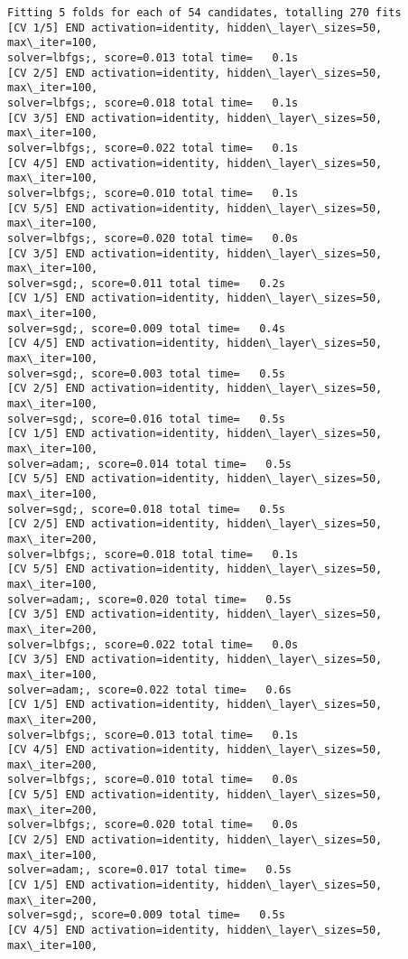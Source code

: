 \documentclass[11pt]{article}
\begin{document}
    \begin{Verbatim}[commandchars=\\\{\}]
Fitting 5 folds for each of 54 candidates, totalling 270 fits
[CV 1/5] END activation=identity, hidden\_layer\_sizes=50, max\_iter=100,
solver=lbfgs;, score=0.013 total time=   0.1s
[CV 2/5] END activation=identity, hidden\_layer\_sizes=50, max\_iter=100,
solver=lbfgs;, score=0.018 total time=   0.1s
[CV 3/5] END activation=identity, hidden\_layer\_sizes=50, max\_iter=100,
solver=lbfgs;, score=0.022 total time=   0.1s
[CV 4/5] END activation=identity, hidden\_layer\_sizes=50, max\_iter=100,
solver=lbfgs;, score=0.010 total time=   0.1s
[CV 5/5] END activation=identity, hidden\_layer\_sizes=50, max\_iter=100,
solver=lbfgs;, score=0.020 total time=   0.0s
[CV 3/5] END activation=identity, hidden\_layer\_sizes=50, max\_iter=100,
solver=sgd;, score=0.011 total time=   0.2s
[CV 1/5] END activation=identity, hidden\_layer\_sizes=50, max\_iter=100,
solver=sgd;, score=0.009 total time=   0.4s
[CV 4/5] END activation=identity, hidden\_layer\_sizes=50, max\_iter=100,
solver=sgd;, score=0.003 total time=   0.5s
[CV 2/5] END activation=identity, hidden\_layer\_sizes=50, max\_iter=100,
solver=sgd;, score=0.016 total time=   0.5s
[CV 1/5] END activation=identity, hidden\_layer\_sizes=50, max\_iter=100,
solver=adam;, score=0.014 total time=   0.5s
[CV 5/5] END activation=identity, hidden\_layer\_sizes=50, max\_iter=100,
solver=sgd;, score=0.018 total time=   0.5s
[CV 2/5] END activation=identity, hidden\_layer\_sizes=50, max\_iter=200,
solver=lbfgs;, score=0.018 total time=   0.1s
[CV 5/5] END activation=identity, hidden\_layer\_sizes=50, max\_iter=100,
solver=adam;, score=0.020 total time=   0.5s
[CV 3/5] END activation=identity, hidden\_layer\_sizes=50, max\_iter=200,
solver=lbfgs;, score=0.022 total time=   0.0s
[CV 3/5] END activation=identity, hidden\_layer\_sizes=50, max\_iter=100,
solver=adam;, score=0.022 total time=   0.6s
[CV 1/5] END activation=identity, hidden\_layer\_sizes=50, max\_iter=200,
solver=lbfgs;, score=0.013 total time=   0.1s
[CV 4/5] END activation=identity, hidden\_layer\_sizes=50, max\_iter=200,
solver=lbfgs;, score=0.010 total time=   0.0s
[CV 5/5] END activation=identity, hidden\_layer\_sizes=50, max\_iter=200,
solver=lbfgs;, score=0.020 total time=   0.0s
[CV 2/5] END activation=identity, hidden\_layer\_sizes=50, max\_iter=100,
solver=adam;, score=0.017 total time=   0.5s
[CV 1/5] END activation=identity, hidden\_layer\_sizes=50, max\_iter=200,
solver=sgd;, score=0.009 total time=   0.5s
[CV 4/5] END activation=identity, hidden\_layer\_sizes=50, max\_iter=100,

\end{Verbatim}
\end{document}
